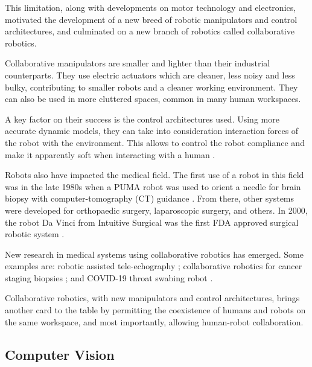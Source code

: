 This limitation, along with developments on motor technology and electronics, motivated the development of a new breed of robotic manipulators and control architectures, and culminated on a new branch of robotics called collaborative robotics. 

Collaborative manipulators are smaller and lighter than their industrial counterparts. They use electric actuators which are cleaner, less noisy and less bulky, contributing to smaller robots and a cleaner working environment. They can also be used in more cluttered spaces, common in many human workspaces.

A key factor on their success is the control architectures used. Using more accurate dynamic models, they can take into consideration interaction forces of the robot with the environment. This allows to control the robot compliance and make it apparently soft when interacting with a human \cite{Bloss2016_collaborative_robotics_improvements}.

Robots also have impacted the medical field. The first use of a robot in this field was in the late 1980s when a PUMA robot was used to orient a needle for brain biopsy with computer-tomography (CT) guidance \cite{Kwoh1988_puma_brain_surgery}. From there, other systems were developed for orthopaedic surgery, laparoscopic surgery, and others. In 2000, the robot Da Vinci from Intuitive Surgical was the first FDA approved surgical robotic system \cite{FoodAndDrugAdministration2000_fda_approves_davinci}.

New research in medical systems using collaborative robotics has emerged. Some examples are: robotic assisted tele-echography \cite{Santos2018_computed_torque_control_robotic_assisted_tele_ecography}; collaborative robotics for cancer staging biopsies \cite{Esposito2016_collaborative_robotics_cancer_staging_biopsies}; and COVID-19 throat swabing robot \cite{Dalgaard2020_covid19_swabing_robot}.

Collaborative robotics, with new manipulators and control architectures, brings another card to the table by permitting the coexistence of humans and robots on the same workspace, and most importantly, allowing human-robot collaboration.


\subsection{Computer Vision} %
\label{subsec:computer_vision}

